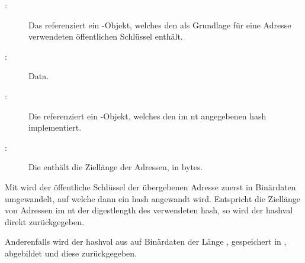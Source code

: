 \begin{description}
	
	\item [{:}]
		Das \javaarg {} referenziert ein -Objekt, welches den
		als Grundlage für eine Adresse verwendeten öffentlichen Schlüssel enthält.
	
	\item [{:}]
		\glsdesc{Data}.
	
	\item [{:}]
		Die \javainstvar {} referenziert ein -Objekt, welches den
		im \gls{nt} angegebenen \gls{hash} implementiert.
	
	\item [{:}]
		Die \javainstvar {} enthält die Ziellänge der Adressen, in bytes.
	
\end{description}

Mit  wird der öffentliche Schlüssel der übergebenen Adresse zuerst in Binärdaten
umgewandelt, auf welche dann ein \gls{hash} angewandt wird. Entspricht die Ziellänge von Adressen im
\gls{nt} der \gls{digestlength} des verwendeten \gls{hash}, so wird der \gls{hashval} 
direkt zurückgegeben.

Anderenfalls wird der \gls{hashval} aus  auf Binärdaten der Länge ,
gespeichert in , abgebildet und diese zurückgegeben.


